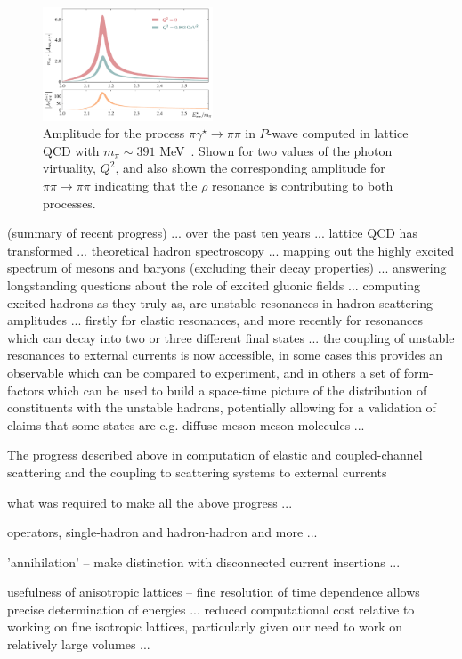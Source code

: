 {\begin{figure}
\includegraphics[width=0.45\textwidth]{dudek/rho_pi_gamma}
\caption{Amplitude for the process ${\pi \gamma^\star \to \pi\pi}$ in $P$-wave computed in lattice QCD with $m_\pi \sim 391$ MeV~\cite{Briceno:2016kkp,Briceno:2015dca}. Shown for two values of the photon virtuality, $Q^2$, and also shown the corresponding amplitude for $\pi\pi \to \pi \pi$ indicating that the $\rho$ resonance is contributing to both processes.  }
\label{rhopigamma}
\end{figure}

{\color{blue} (summary of recent progress)} ... over the past ten years ... lattice QCD has transformed ... theoretical hadron spectroscopy ... mapping out the highly excited spectrum of mesons and baryons (excluding their decay properties) ... answering longstanding questions about the role of excited gluonic fields ... computing excited hadrons as they truly as, are unstable resonances in hadron scattering amplitudes ... firstly for elastic resonances, and more recently for resonances which can decay into two or three different final states ... the coupling of unstable resonances to external currents is now accessible, in some cases this provides an observable which can be compared to experiment, and in others a set of form-factors which can be used to build a space-time picture of the distribution of constituents with the unstable hadrons, potentially allowing for a validation of claims that some states are e.g. diffuse meson-meson molecules ...



The progress described above in computation of elastic and coupled-channel scattering and the coupling to scattering systems to external currents 
{\color{red}
what was required to make all the above progress ...

operators, single-hadron and hadron-hadron and more ...

'annihilation' -- make distinction with disconnected current insertions ...

usefulness of anisotropic lattices -- fine resolution of time dependence allows precise determination of energies ... reduced computational cost relative to working on fine isotropic lattices, particularly given our need to work on relatively large volumes ... 

}}
